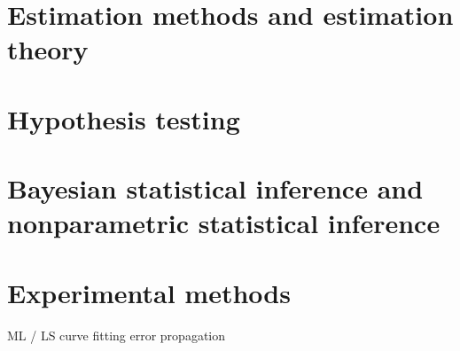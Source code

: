 \chapter{Estimation methods and estimation theory}

\chapter{Hypothesis testing}

\chapter{Bayesian statistical inference and nonparametric statistical inference}

\chapter{Experimental methods}
ML / LS curve fitting
error propagation
